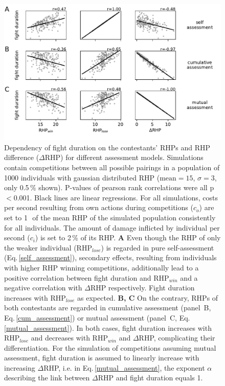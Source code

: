 \documentclass[11pt,pdftex]{article}
\newcommand{\figitem}[1]{\textsf{\bfseries\uppercase{#1}}\penalty10000 }
\newcommand{\panel}[1]{\textsf{#1}}
\newcommand{\eqnrefb}[1]{Eq.\,\ref{#1}}
\begin{document}
\begin{figure}[h!]
  \centerline{\includegraphics[width=.9\textwidth]{assessment_models_correlations}}
  \caption{\label{assessment_correlations} Dependency of fight duration on the contestants' RHPs and RHP difference ($\Delta$RHP) for different assessment models. Simulations contain competitions between all possible pairings in a population of 1000 individuals with gaussian distributed RHP ($\text{mean}=15$, $\sigma = 3$, only 0.5\,\% shown). P-values of pearson rank correlations were all p$<$0.001. Black lines are linear regressions. For all simulations, costs per second resulting from own actions during competitions ($c_o$) are set to 1\,\textperthousand\, of the mean RHP of the simulated population consistently for all individuals. The amount of damage inflicted by individual per second ($c_i$) is set to 2\,\% of its RHP. \figitem{A} Even though the RHP of only the weaker individual (RHP$_{lose}$) is regarded in pure self-assessment (\eqnrefb{self_assessment}), secondary effects, resulting from individuals with higher RHP winning competitions, additionally lead to a positive correlation between fight duration and RHP$_{win}$ and a negative correlation with $\Delta$RHP respectively. Fight duration increases with RHP$_{lose}$ as expected. \figitem{B, C} On the contrary, RHPs of both contestants are regarded in cumulative assessment (panel~\panel{B}, \eqnrefb{cum_assessment}) or mutual assessment (panel~\panel{C}, \eqnrefb{mutual_assessment}). In both cases, fight duration increases with RHP$_{lose}$ and decreases with RHP$_{win}$ and $\Delta$RHP, complicating their differentiation. For the simulation of competitions assuming mutual assessment, fight duration is assumed to linearly increase with increasing $\Delta$RHP, i.e. in \eqnrefb{mutual_assessment}, the exponent $\alpha$ describing the link between $\Delta$RHP and fight duration equals 1.}
\end{figure}
\end{document}
